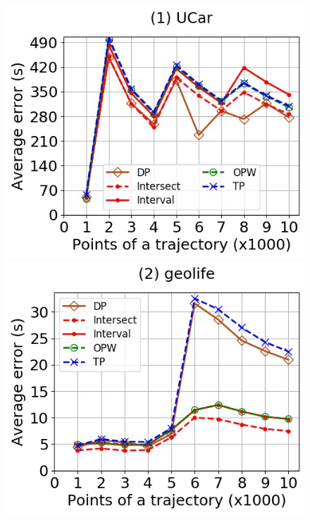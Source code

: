 {\begin{figure}[tb!]
	\centering
	\includegraphics[scale=0.350]{Figures/Exp-when-DAD-error-size-service.jpg}	\hspace{0.5ex}
	\includegraphics[scale=0.350]{Figures/Exp-when-DAD-error-size-geolife.jpg}	\hspace{0.5ex}

\end{figure}}

